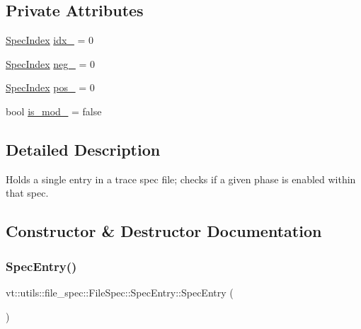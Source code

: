 \subsection*{Private Attributes}
\begin{DoxyCompactItemize}
\item 
\hyperlink{structvt_1_1utils_1_1file__spec_1_1_file_spec_a3817fca09dbe932e0f6ba5729f1965ba}{Spec\+Index} \hyperlink{structvt_1_1utils_1_1file__spec_1_1_file_spec_1_1_spec_entry_a752a75d8811ade915c7cbc9d0771c13a}{idx\+\_\+} = 0
\item 
\hyperlink{structvt_1_1utils_1_1file__spec_1_1_file_spec_a3817fca09dbe932e0f6ba5729f1965ba}{Spec\+Index} \hyperlink{structvt_1_1utils_1_1file__spec_1_1_file_spec_1_1_spec_entry_a23da7a0e8133ec0145b5de803c6b5237}{neg\+\_\+} = 0
\item 
\hyperlink{structvt_1_1utils_1_1file__spec_1_1_file_spec_a3817fca09dbe932e0f6ba5729f1965ba}{Spec\+Index} \hyperlink{structvt_1_1utils_1_1file__spec_1_1_file_spec_1_1_spec_entry_af8f716fd38fc23b6adb04b113199814e}{pos\+\_\+} = 0
\item 
bool \hyperlink{structvt_1_1utils_1_1file__spec_1_1_file_spec_1_1_spec_entry_adf5b821e5a0d2aed8e6e0c8bed44dcbc}{is\+\_\+mod\+\_\+} = false
\end{DoxyCompactItemize}


\subsection{Detailed Description}
Holds a single entry in a trace spec file; checks if a given phase is enabled within that spec. 

\subsection{Constructor \& Destructor Documentation}
\mbox{\label{structvt_1_1utils_1_1file__spec_1_1_file_spec_1_1_spec_entry_a397a1ede199e831a0a532171c912936c}} 
\subsubsection{\texorpdfstring{Spec\+Entry()}{SpecEntry()}\hspace{0.1cm}{\footnotesize\ttfamily [1/2]}}
{\footnotesize\ttfamily vt\+::utils\+::file\+\_\+spec\+::\+File\+Spec\+::\+Spec\+Entry\+::\+Spec\+Entry (\begin{DoxyParamCaption}{ }\end{DoxyParamCaption})\hspace{0.3cm}{\ttfamily [default]}}

